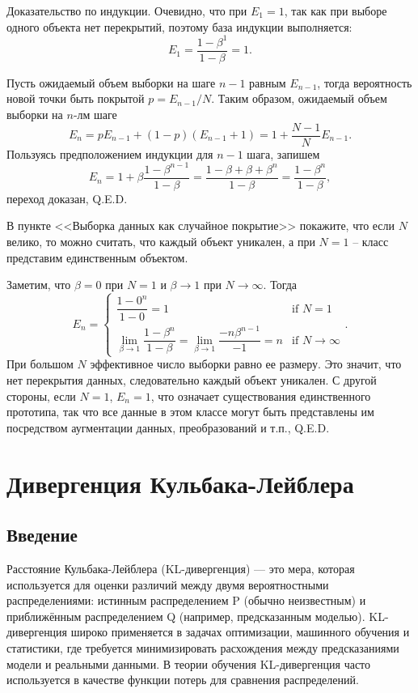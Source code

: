 \begin{solution}
    Доказательство по индукции. Очевидно, что при $E_1=1$, так как при выборе одного объекта нет перекрытий, поэтому база индукции выполняется:
    \[
        E_1=\dfrac{1-\beta^1}{1-\beta}=1.
    \]

    Пусть ожидаемый объем выборки на шаге $n-1$ равным $E_{n-1}$, тогда вероятность новой точки быть покрытой $p=E_{n-1}/N$. Таким образом, ожидаемый объем выборки на $n$-лм шаге
    \[
        E_n=pE_{n-1}+(1-p)(E_{n-1}+1)=1+\dfrac{N-1}{N}E_{n-1}.
    \]
    Пользуясь предположением индукции для $n-1$ шага, запишем
    \[
        E_n=1+\beta\dfrac{1-\beta^{n-1}}{1-\beta}=\dfrac{1-\beta+\beta+\beta^{n}}{1-\beta}=\dfrac{1-\beta^{n}}{1-\beta},
    \]
    переход доказан, Q.E.D.
\end{solution}

\begin{problem}
    В пункте <<Выборка данных как случайное покрытие>>  покажите, что если $N$ велико, то можно считать, что каждый объект уникален, а при $N=1$ -- класс представим единственным объектом.
\end{problem}

\begin{solution}
    Заметим, что $\beta=0$ при $N=1$ и $\beta \to 1$ при $N \to \infty$. Тогда
    \[
        E_n=\begin{cases}
            \dfrac{1-0^n}{1-0}=1 & \text{if } N=1 \\
            \lim\limits_{\beta \to 1}\dfrac{1-\beta^n}{1-\beta}=\lim\limits_{\beta \to 1}\dfrac{-n\beta^{n-1}}{-1}=n & \text{if } N \to \infty
        \end{cases}.
    \]
    При большом $N$ эффективное число выборки равно ее размеру. Это значит, что нет перекрытия данных, следовательно каждый объект уникален. С другой стороны, если $N=1$, $E_n=1$, что означает существования единственного прототипа, так что все данные в этом классе могут быть представлены им посредством аугментации данных, преобразований и т.п., Q.E.D.
\end{solution}

\section*{Дивергенция Кульбака-Лейблера}

\subsection*{Введение}
Расстояние Кульбака-Лейблера (KL-дивергенция) — это мера, которая используется для оценки различий между двумя вероятностными распределениями: истинным распределением P (обычно неизвестным) и приближённым распределением Q  (например, предсказанным моделью). KL-дивергенция широко применяется в задачах оптимизации, машинного обучения и статистики, где требуется минимизировать расхождения между предсказаниями модели и реальными данными. В теории обучения KL-дивергенция часто используется в качестве функции потерь для сравнения распределений.

